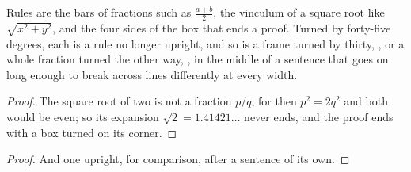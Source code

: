\documentclass{article}
\begin{document}
Rules are the bars of fractions such as $\frac{a+b}{2}$, the vinculum of a
square root like $\sqrt{x^2+y^2}$, and the four sides of the box that ends
a proof. Turned by  forty-five degrees, each
is a rule no longer upright, and so is a frame turned by thirty,
, or a whole fraction turned the other way,
, in the middle of a sentence that goes on
long enough to break across lines differently at every width.
\begin{proof}
The square root of two is not a fraction $p/q$, for then $p^2 = 2q^2$ and
both would be even; so its expansion $\sqrt{2} = 1.41421\ldots$ never ends,
and the proof ends with a box turned on its corner.
\renewcommand{\qedsymbol}{\rotatebox{45}{\openbox}}
\end{proof}
\begin{proof}
And one upright, for comparison, after a sentence of its own.
\end{proof}
\end{document}
